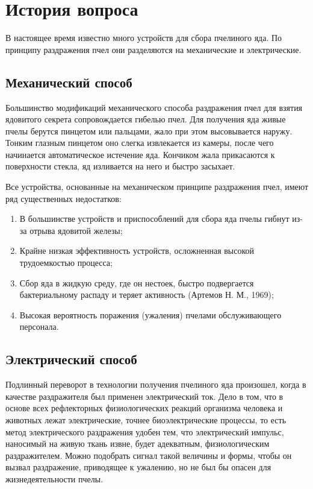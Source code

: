 \section{История вопроса}

В настоящее время известно много устройств для сбора пчелиного яда. По принципу раздражения пчел они разделяются на механические и электрические.

\subsection*{Механический способ}

Большинство модификаций механического способа раздражения пчел для взятия ядовитого секрета сопровождается гибелью пчел. Для получения яда живые пчелы берутся пинцетом или пальцами, жало при этом высовывается наружу. Тонким глазным пинцетом оно слегка извлекается из камеры, после чего начинается автомати­ческое истечение яда. Кончиком жала прикасаются к поверхности стекла, яд изливается на него и быстро засыхает.

Все устройства, основанные на механическом принципе раздра­жения пчел, имеют ряд существенных недостатков:
\begin{enumerate}
	\item В большинстве устройств и приспособлений для сбора яда пчелы гибнут из-за отрыва ядовитой железы; 
	\item Крайне низкая эффективность устройств, осложненная высо­кой трудоемкостью процесса;
	\item Сбор яда в жидкую среду, где он нестоек, быстро подвергает­ся бактериальному распаду и теряет активность (Артемов Н. М., 1969);
	\item Высокая вероятность поражения (ужаления) пчелами обслужи­вающего персонала.
\end{enumerate}

\subsection*{Электрический способ}

Подлинный переворот в технологии получения пчелиного яда произошел, когда в качестве раздражителя был применен электрический ток. Дело в том, что в основе всех рефлекторных физиологических реакций организма человека и животных лежат электрические, точнее \longndash биоэлектрические процессы, то есть метод электрического раздражения удобен тем, что электрический импульс, наносимый на живую ткань извне, будет адекватным, физиологическим раздражителем. Можно подобрать сигнал такой величины и формы, чтобы он вызвал раздражение, приводящее к ужалению, но не был бы опасен для жизнедеятельности пчелы.

